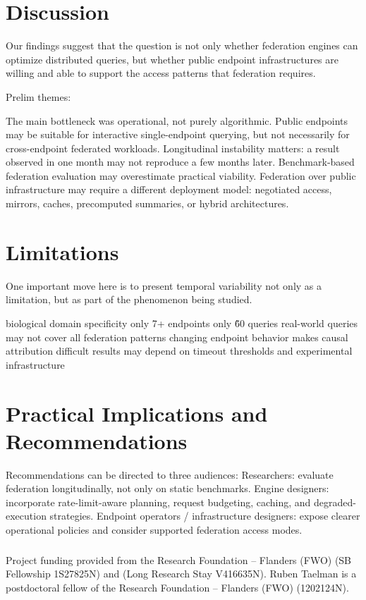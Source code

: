 \documentclass[runningheads]{llncs}
\begin{document}
\section{Discussion}\label{sec5}

Our findings suggest that the question is not only whether federation engines can optimize distributed queries, but whether public endpoint infrastructures are willing and able to support the access patterns that federation requires.

Prelim themes:

The main bottleneck was operational, not purely algorithmic.
Public endpoints may be suitable for interactive single-endpoint querying, but not necessarily for cross-endpoint federated workloads.
Longitudinal instability matters: a result observed in one month may not reproduce a few months later.
Benchmark-based federation evaluation may overestimate practical viability.
Federation over public infrastructure may require a different deployment model: negotiated access, mirrors, caches, precomputed summaries, or hybrid architectures.


\section{Limitations}\label{sec6}
One important move here is to present temporal variability not only as a limitation, but as part of the phenomenon being studied.

biological domain specificity
only 7+ endpoints
only \~60 queries
real-world queries may not cover all federation patterns
changing endpoint behavior makes causal attribution difficult
results may depend on timeout thresholds and experimental infrastructure


\section{Practical Implications and Recommendations}\label{sec7}

Recommendations can be directed to three audiences:
Researchers: evaluate federation longitudinally, not only on static benchmarks.
Engine designers: incorporate rate-limit-aware planning, request budgeting, caching, and degraded-execution strategies.
Endpoint operators / infrastructure designers: expose clearer operational policies and consider supported federation access modes.


\begin{credits}
\subsubsection{\ackname} 
Project funding provided from the Research Foundation – Flanders (FWO) (SB Fellowship 1S27825N) and (Long Research Stay V416635N).
Ruben Taelman is a postdoctoral fellow of the Research Foundation – Flanders (FWO) (1202124N).

\end{credits}



\end{document}
